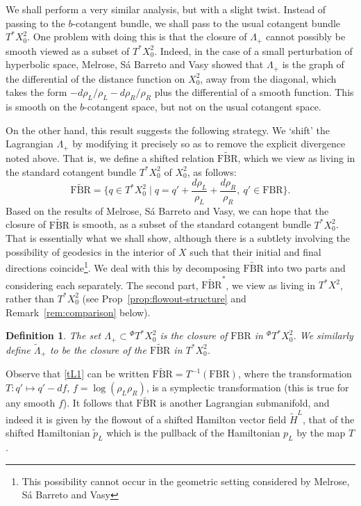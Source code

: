 \documentclass[10pt, a4paper, twoside]{amsart}
\numberwithin{equation}{section}
\newtheorem{definition}[theorem]{Definition}
\theoremstyle{remark}
\begin{document}
We shall perform a very similar analysis, but with a slight twist. Instead of passing to the $b$-cotangent bundle, we shall pass to the usual cotangent bundle $T^* X^2_0$. One problem with doing this is that the closure of $\Lambda_+$ cannot possibly be smooth viewed as a subset of $T^* X^2_0$. Indeed, in the case of a small perturbation of hyperbolic space, Melrose, S\'{a} Barreto and Vasy showed that $\Lambda_+$ is the graph of the differential of the distance function on $X^2_0$, away from the diagonal, which takes the form $-d\rho_L/\rho_L - d\rho_R/\rho_R$ plus the differential of a smooth function. This is smooth on the $b$-cotangent space, but not on the usual cotangent space. 

On the other hand, this result suggests the following strategy. We `shift' the Lagrangian $\Lambda_+$ by modifying it precisely so as to remove the explicit divergence noted above. That is, we define a shifted relation ${\widetilde{\mathrm{FBR}}}$, which we view as living in the standard cotangent bundle $T^* X^2_0$ of $X^2_0$, as follows:
\begin{equation}
{\widetilde{\mathrm{FBR}}} = \{ q \in T^* X^2_0 \mid q = q' + \frac{d\rho_L}{\rho_L} + \frac{d\rho_R}{\rho_R}, \ q' \in {\mathrm{FBR}} \}. 
\label{tL1}\end{equation}
Based on the results of Melrose, S\'{a} Barreto and Vasy, we can hope that the closure of ${\widetilde{\mathrm{FBR}}}$ is smooth, as a subset of the standard cotangent bundle $T^* X^2_0$. That is essentially what we shall show, although there is a subtlety involving the possibility of geodesics in the interior of $X$ such that their initial and final directions coincide\footnote{This possibility cannot occur in the geometric setting considered by Melrose, S\'{a} Barreto and Vasy}. We deal with this by decomposing ${\widetilde{\mathrm{FBR}}}$ into two parts and considering each separately. The second part, ${\widetilde{\mathrm{FBR}}}^*$, we view as living in $T^* X^2$, rather than $T^* X^2_0$ (see Prop~\ref{prop:flowout-structure} and Remark~\ref{rem:comparison} below). 

\begin{definition} The set $\Lambda_+ \subset {}^\Phi T^* X^2_0$ is the closure of ${\mathrm{FBR}}$ in ${}^\Phi T^* X^2_0$. We similarly define ${\tilde \Lambda}_+$ to be the closure of the ${\widetilde{\mathrm{FBR}}}$ in $T^* X^2_0$. 
\end{definition}

Observe that \eqref{tL1} can be written ${\widetilde{\mathrm{FBR}}} = T^{-1}({\mathrm{FBR}})$, where the transformation $T: q' \mapsto q' - df$, $f =  \log (\rho_L \rho_R)$,  is a symplectic transformation (this is true for any smooth $f$). It follows that ${\widetilde{\mathrm{FBR}}}$ is another Lagrangian submanifold, and indeed it is given by the flowout of a shifted Hamilton vector field ${\tilde H^L}$, that of the shifted Hamiltonian ${\tilde p_L}$ which is the pullback of the Hamiltonian $p_L$ by the map $T$. 
\end{document}
